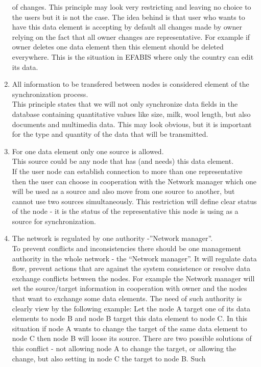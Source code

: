 \begin{enumerate}
of changes. This principle may look very restricting and leaving no
choice to the users but it is not the case. The idea behind is that
user who wants to have this data element is accepting by default all
changes made by owner relying on the fact that all owner changes are
representative. For example if owner deletes one data element then
this element should be deleted everywhere. This is the situation in
EFABIS where only the country can edit its data.
\item All information to be transfered between nodes is considered element
of the synchronization process.\\
This principle states that we will not only synchronize data fields
in the database containing quantitative values like size, milk, wool
length, but also documents and multimedia data. This may look obvious,
but it is important for the type and quantity of the data that will
be transmitted.
\item For one data element only one source is allowed.\\
This source could be any node that has (and needs) this data element. \\
If the user node can establish connection to more than one representative
then the user can choose in cooperation with the Network manager which
one will be used as a source and also move from one source to another,
but cannot use two sources simultaneously. This restriction will define
clear status of the node - it is the status of the representative
this node is using as a source for synchronization.
\item The network is regulated by one authority -''Network manager''.\\
To prevent conflicts and inconsistencies there should be one management
authority in the whole network - the {}``Network manager''. It will
regulate data flow, prevent actions that are against the system consistence
or resolve data exchange conflicts between the nodes. For example
the Network manager will set the source/target information in cooperation
with owner and the nodes that want to exchange some data elements.
The need of such authority is clearly view by the following example:
Let the node A target one of its data elements to node B and node
B target this data element to node C. In this situation if node A
wants to change the target of the same data element to node C then
node B will loose its source. There are two possible solutions of
this conflict - not allowing node A to change the target, or allowing
the change, but also setting in node C the target to node B. Such

\end{enumerate}

